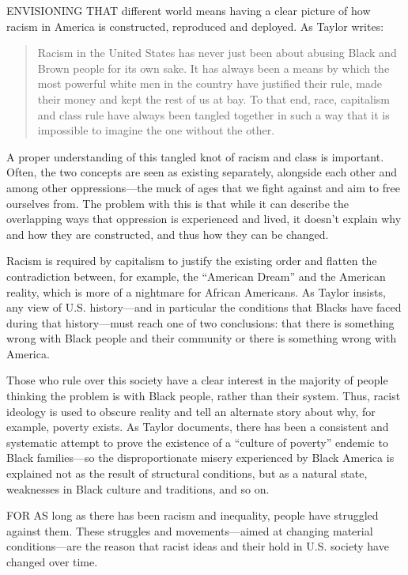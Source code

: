 \sectiondivider

ENVISIONING THAT different world means having a clear picture of how racism in America is constructed, reproduced and deployed. As Taylor writes:

\blockquote{Racism in the United States has never just been about abusing Black and Brown people for its own sake. It has always been a means by which the most powerful white men in the country have justified their rule, made their money and kept the rest of us at bay. To that end, race, capitalism and class rule have always been tangled together in such a way that it is impossible to imagine the one without the other.}

A proper understanding of this tangled knot of racism and class is important. Often, the two concepts are seen as existing separately, alongside each other and among other oppressions---the muck of ages that we fight against and aim to free ourselves from. The problem with this is that while it can describe the overlapping ways that oppression is experienced and lived, it doesn't explain why and how they are constructed, and thus how they can be changed.

Racism is required by capitalism to justify the existing order and flatten the contradiction between, for example, the ``American Dream'' and the American reality, which is more of a nightmare for African Americans. As Taylor insists, any view of U.S. history---and in particular the conditions that Blacks have faced during that history---must reach one of two conclusions: that there is something wrong with Black people and their community or there is something wrong with America.

Those who rule over this society have a clear interest in the majority of people thinking the problem is with Black people, rather than their system. Thus, racist ideology is used to obscure reality and tell an alternate story about why, for example, poverty exists. As Taylor documents, there has been a consistent and systematic attempt to prove the existence of a ``culture of poverty'' endemic to Black families---so the disproportionate misery experienced by Black America is explained not as the result of structural conditions, but as a natural state, weaknesses in Black culture and traditions, and so on.

FOR AS long as there has been racism and inequality, people have struggled against them. These struggles and movements---aimed at changing material conditions---are the reason that racist ideas and their hold in U.S. society have changed over time.

